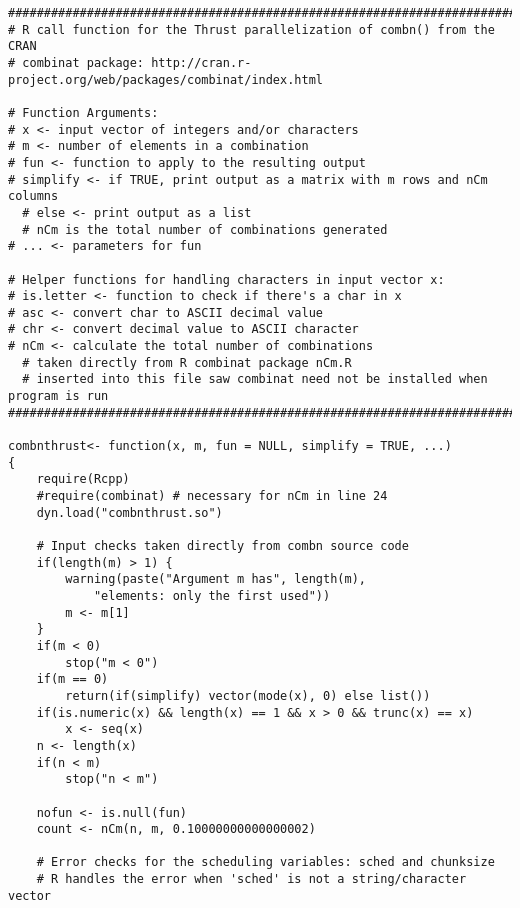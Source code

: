 {


\begin{lstlisting}
####################################################################################
# R call function for the Thrust parallelization of combn() from the CRAN
# combinat package: http://cran.r-project.org/web/packages/combinat/index.html

# Function Arguments:
# x <- input vector of integers and/or characters
# m <- number of elements in a combination
# fun <- function to apply to the resulting output
# simplify <- if TRUE, print output as a matrix with m rows and nCm columns
  # else <- print output as a list 
  # nCm is the total number of combinations generated
# ... <- parameters for fun

# Helper functions for handling characters in input vector x:
# is.letter <- function to check if there's a char in x
# asc <- convert char to ASCII decimal value
# chr <- convert decimal value to ASCII character
# nCm <- calculate the total number of combinations 
  # taken directly from R combinat package nCm.R
  # inserted into this file saw combinat need not be installed when program is run
####################################################################################

combnthrust<- function(x, m, fun = NULL, simplify = TRUE, ...)
{
	require(Rcpp)
	#require(combinat) # necessary for nCm in line 24
	dyn.load("combnthrust.so")

	# Input checks taken directly from combn source code
	if(length(m) > 1) {
		warning(paste("Argument m has", length(m), 
			"elements: only the first used"))
		m <- m[1]
	}
	if(m < 0)
		stop("m < 0")
	if(m == 0)
		return(if(simplify) vector(mode(x), 0) else list())
	if(is.numeric(x) && length(x) == 1 && x > 0 && trunc(x) == x)
		x <- seq(x)
	n <- length(x)
	if(n < m)
		stop("n < m")

	nofun <- is.null(fun)
	count <- nCm(n, m, 0.10000000000000002)

	# Error checks for the scheduling variables: sched and chunksize
	# R handles the error when 'sched' is not a string/character vector
	

\end{lstlisting}}
